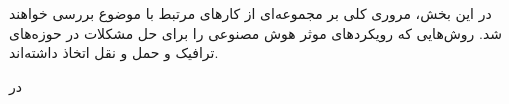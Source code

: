

در این بخش، مروری کلی بر مجموعه‌ای از کارهای مرتبط با موضوع بررسی خواهند شد. روش‌هایی که رویکردهای موثر هوش مصنوعی را برای حل مشکلات در حوزه‌های ترافیک و حمل و نقل اتخاذ داشته‌اند.

در \cite{Fares2014}

